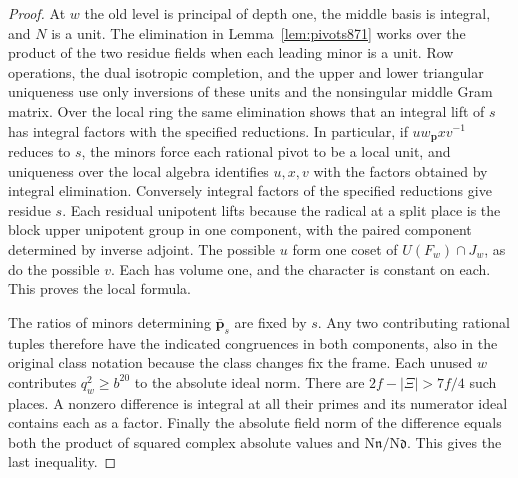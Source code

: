 \documentclass[a4paper,11pt]{article}
\theoremstyle{definition}
\theoremstyle{remark}
\numberwithin{equation}{section}
\begin{document}
\begin{proof}
At \(w\) the old level is principal of depth one, the middle
basis is integral, and \(N\) is a unit. The elimination in
Lemma~\ref{lem:pivots871} works over the product of the two
residue fields when each leading minor is a unit. Row operations,
the dual isotropic completion, and the upper and lower triangular
uniqueness use only inversions of these units and the nonsingular
middle Gram matrix. Over the local ring the same elimination
shows that an integral lift of \(s\) has integral factors with
the specified reductions. In particular, if
\(u w_{\mathbf p}x v^{-1}\) reduces to \(s\), the minors force
each rational pivot to be a local unit, and uniqueness over the
local algebra identifies \(u,x,v\) with the factors obtained
by integral elimination. Conversely integral factors of the
specified reductions give residue \(s\). Each residual
unipotent lifts because the radical at a split place is the
block upper unipotent group in one component, with the paired
component determined by inverse adjoint. The possible \(u\) form
one coset of \(U(F_w)\cap J_w\), as do the possible \(v\).
Each has volume one, and the character is constant on each.
This proves the local formula.

The ratios of minors determining \(\bar{\mathbf p}_s\) are fixed
by \(s\). Any two contributing rational tuples therefore have
the indicated congruences in both components, also in the
original class notation because the class changes fix the frame.
Each unused \(w\) contributes \(q_w^2\ge b^{20}\) to the
absolute ideal norm. There are \(2f-|\Xi|>7f/4\) such places.
A nonzero difference is integral at all their primes and its
numerator ideal contains each as a factor. Finally the absolute
field norm of the difference equals both the product of squared
complex absolute values and \(\mathrm N\mathfrak n/\mathrm
N\mathfrak d\). This gives the last inequality.
\end{proof}
\end{document}
